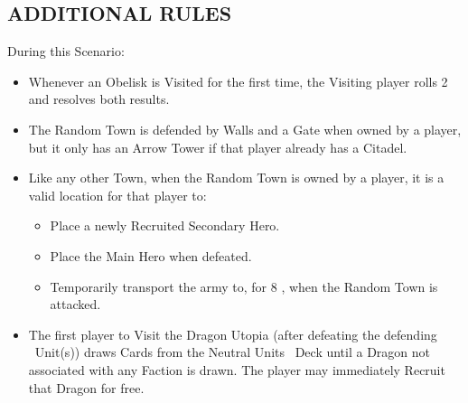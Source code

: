 \begin{multicols}{2}
\subsection*{\MakeUppercase{Additional Rules}}
During this Scenario:
\begin{itemize}
  \item Whenever an Obelisk is Visited for the first time, the Visiting player rolls 2  and resolves both results.
  \item The Random Town is defended by Walls and a Gate when owned by a player, but it only has an Arrow Tower if that player already has a Citadel.
  \item Like any other Town, when the Random Town is owned by a player, it is a valid location for that player to:
    \begin{itemize}
      \item Place a newly Recruited Secondary Hero.
      \item Place the Main Hero when defeated.
      \item Temporarily transport the army to, for 8 , when the Random Town is attacked.
    \end{itemize}
  \item The first player to Visit the Dragon Utopia (after defeating the defending \azure\ Unit(s)) draws Cards from the Neutral Units \azure\ Deck until a Dragon not associated with any Faction is drawn.
    The player may immediately Recruit that Dragon for free.
\end{itemize}

\columnbreak

\phantom{.}
\vfill
\begin{center}
\end{center}
\vfill
\phantom{.}
\end{multicols}


